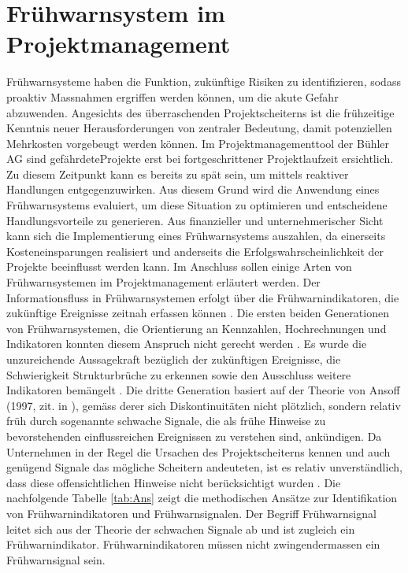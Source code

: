 \section{Frühwarnsystem im Projektmanagement}\label{sec:ewspm}
Frühwarnsysteme haben die Funktion, zukünftige Risiken zu identifizieren, sodass proaktiv Massnahmen ergriffen werden können, um die akute Gefahr abzuwenden. Angesichts des überraschenden Projektscheiterns ist die frühzeitige Kenntnis neuer Herausforderungen von zentraler Bedeutung, damit potenziellen Mehrkosten vorgebeugt werden können. Im Projektmanagementtool der Bühler AG sind \glqq gefährdete\grqq{ }Projekte erst bei fortgeschrittener Projektlaufzeit ersichtlich. Zu diesem Zeitpunkt kann es bereits zu spät sein, um mittels reaktiver Handlungen entgegenzuwirken. Aus diesem Grund wird die Anwendung eines Frühwarnsystems evaluiert, um diese Situation zu optimieren und entscheidene Handlungsvorteile zu generieren. Aus finanzieller und unternehmerischer Sicht kann sich die Implementierung eines Frühwarnsystems auszahlen, da einerseits Kosteneinsparungen realisiert und anderseits die Erfolgswahrscheinlichkeit der Projekte beeinflusst werden kann. Im Anschluss sollen einige Arten von Frühwarnsystemen im Projektmanagement erläutert werden.  
\newline\newline
Der Informationsfluss in Frühwarnsystemen erfolgt über die Frühwarnindikatoren, die zukünftige Ereignisse zeitnah erfassen können \citep[S.~24]{jacrieg12}. Die ersten beiden Generationen von Frühwarnsystemen, die Orientierung an Kennzahlen, Hochrechnungen und Indikatoren konnten diesem Anspruch nicht gerecht werden \citep[S.~25-30]{jacrieg12}. Es wurde die unzureichende Aussagekraft bezüglich der zukünftigen Ereignisse, die Schwierigkeit Strukturbrüche zu erkennen sowie den Ausschluss weitere Indikatoren bemängelt \citep [S.~26-28]{jacrieg12}. Die dritte Generation basiert auf der Theorie von Ansoff (1997, zit. in \citealp{haan13}), gemäss derer sich Diskontinuitäten nicht plötzlich, sondern relativ früh durch sogenannte schwache Signale, die als frühe Hinweise zu bevorstehenden einflussreichen Ereignissen zu verstehen sind, ankündigen. Da Unternehmen in der Regel die Ursachen des Projektscheiterns kennen und auch genügend Signale das mögliche Scheitern andeuteten, ist es relativ unverständlich, dass diese offensichtlichen Hinweise nicht berücksichtigt wurden \citep{haan13}. Die nachfolgende Tabelle \ref{tab:Ans} zeigt die methodischen Ansätze zur Identifikation von Frühwarnindikatoren und Frühwarnsignalen. Der Begriff \glqq Frühwarnsignal\grqq{} leitet sich aus der Theorie der schwachen Signale ab und ist zugleich ein Frühwarnindikator. Frühwarnindikatoren müssen nicht zwingendermassen ein Frühwarnsignal sein.
